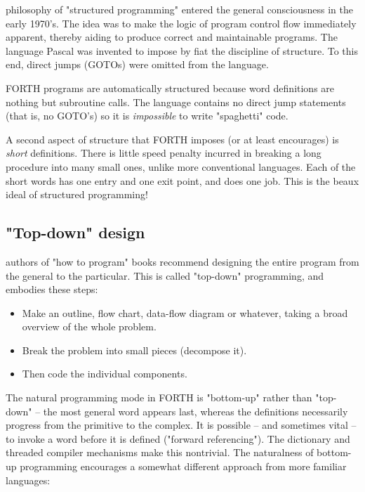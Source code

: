  philosophy of "structured programming" entered the general consciousness in the early 1970’s. The idea was to make the logic of program control flow immediately apparent, thereby aiding to produce correct and maintainable programs. The language Pascal was invented to impose by fiat the discipline of structure. To this end, direct jumps (GOTOs) were omitted from the language.

FORTH programs are automatically structured because word definitions are nothing but subroutine calls. The language contains no direct jump statements (that is, no GOTO's) so it is \textit{impossible} to write "spaghetti" code.

A second aspect of structure that FORTH imposes (or at least encourages) is \textit{short} definitions. There is little speed penalty incurred in breaking a long procedure into many small ones, unlike more conventional languages. Each of the short words has one entry and one exit point, and does one job. This is the beaux ideal of structured programming!

\subsection{"Top-down" design}

 authors of "how to program" books recommend designing the entire program from the general to the particular. This is called "top-down" programming, and embodies these steps:

\begin{itemize}
    \item Make an outline, ﬂow chart, data-ﬂow diagram or whatever, taking a broad overview of the whole problem.
    \item Break the problem into small pieces (decompose it).
    \item Then code the individual components.
\end{itemize}

The natural programming mode in FORTH is "bottom-up" rather than "top-down" -- the most general word appears last, whereas the definitions necessarily progress from the primitive to the complex. It is possible -- and sometimes vital -- to invoke a word before it is defined ("forward referencing"). The dictionary and threaded compiler mechanisms make this nontrivial. The naturalness of bottom-up programming encourages a somewhat different approach from more familiar languages:

